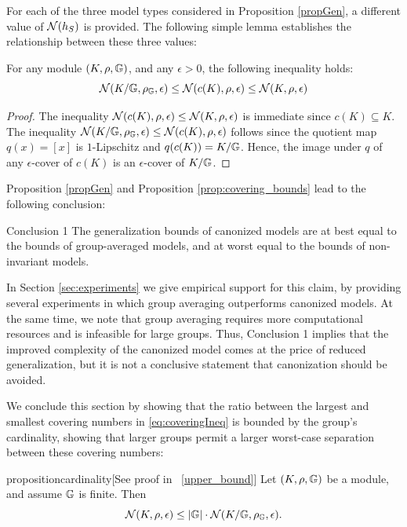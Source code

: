 \documentclass{article}
\begin{document}
For each of the three model types considered in Proposition \ref{propGen}, a different value of $\mathcal{N}(h_S)$ is provided. The following simple lemma establishes the relationship between these three values: 
\begin{proposition} 
\label{prop:covering_bounds}
    For any module $(K,\rho,\mathbb{G})$, and any $\epsilon>0$,  the following inequality holds: 
    \begin{equation}
        \label{eq:coveringIneq}
        \mathcal{N}(K/\mathbb{G},\rho_{\mathbb{G}},\epsilon)\leq \mathcal{N}(c(K),\rho,\epsilon)\leq \mathcal{N}(K,\rho,\epsilon)
    \end{equation}
\end{proposition}

\begin{proof}
The inequality $\mathcal{N}(c(K),\rho,\epsilon)\leq \mathcal{N}(K,\rho,\epsilon)$ is immediate since $c(K)\subseteq K$.
The inequality $\mathcal{N}(K/\mathbb{G},\rho_{\mathbb{G}},\epsilon)\leq \mathcal{N}(c(K),\rho,\epsilon)$ follows since the quotient map $q(x)=[x]$ is $1$-Lipschitz and $q(c(K))=K/\mathbb{G}$. Hence, the image under $q$ of any $\epsilon$-cover of $c(K)$ is an $\epsilon$-cover of $K/\mathbb{G}$.

\end{proof}
Proposition \ref{propGen} and Proposition \ref{prop:covering_bounds} lead to the following conclusion:
\begin{conclusionbox}{Conclusion 1}
The generalization bounds of canonized models are at best equal to the bounds of group-averaged models, and at worst equal to the bounds of non-invariant models.
\end{conclusionbox}
In Section \ref{sec:experiments} we give empirical support for this claim, by providing several experiments in which group averaging outperforms canonized models. At the same time, we note that group averaging requires more computational resources and is infeasible for large groups. Thus, Conclusion 1 implies that the improved complexity of the canonized model comes at the price of reduced generalization, but it is not a conclusive statement that canonization should be avoided.
 
We conclude this section by showing that the ratio between the largest and smallest covering numbers in \eqref{eq:coveringIneq} is bounded by the group's cardinality, showing that larger groups permit a larger worst-case separation between these covering numbers:
\begin{restatable}{proposition}{cardinality}[See proof in ~\ref{upper_bound}]
\label{prop:cardinality}
Let $(K,\rho,\mathbb{G})$ be a module, and assume $\mathbb{G}$ is finite. Then
\[
\mathcal{N}(K,\rho,\epsilon)\le |\mathbb{G}|\cdot \mathcal{N}(K/\mathbb{G},\rho_{\mathbb{G}},\epsilon).
\]
\end{restatable}
\end{document}
